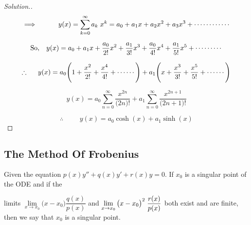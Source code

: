 \documentclass[11pt,a4paper]{article}
\theoremstyle{definition}
\newenvironment{solution}
  {\renewcommand{\qedsymbol}{}\begin{proof}[\textit{Solution}.]}
  {\end{proof}}
\begin{document}
\begin{solution}
$$\implies \hspace{1cm} y(x) = \sum^{\infty}_{k = 0} a_k\hspace{0.1cm}x^k = a_0 + a_1x + a_2 x^2 + a_3x^3+ \cdots\cdots\cdots\cdots$$

$$\text{So},\hspace{0.3cm} y(x) = a_0 + a_1x + \frac{a_0}{2!}x^2 + \frac{a_1}{3!}x^3 + \frac{a_0}{4!}x^4 + \frac{a_1}{5!}x^5 +\cdots\cdots\cdots$$

$$\therefore\hspace{0.5cm} y(x) = a_0\Bigg( 1 + \frac{x^2}{2!}+ \frac{x^4}{4!} +\cdots\cdots\Bigg) + a_1 \Bigg(x + \frac{x^3}{3!} + \frac{x^5}{5!}+ \cdots\cdots \Bigg)$$


$$y(x) = a_0 \sum^{\infty}_{n = 0} \frac{x^{2n}}{\big(2n\big)!} + a_1 \sum^{\infty}_{n=0} \frac{x^{2n+1}}{\big(2n+1\big)!}$$

$$\therefore\hspace{1cm} y(x) = a_0 \cosh (x) + a_1 \sinh (x)$$
\end{solution}


{\color[wave]{485}\subsection{The Method Of Frobenius}}
Given the equation $p(x)y'' + q(x)y' + r(x)y = 0$. If $x_0$ is a singular point of the ODE and if the


 limits $\lim\limits_{x \rightarrow x_0}\big(x -x_0\big) \dfrac{q(x)}{p(x)}$ and $\lim\limits_{x \rightarrow x_0}\big(x -x_0\big)^2\hspace{0.1cm} \dfrac{r(x)}{p(x)}$ both exist and are finite, then we say that $x_0$ is  a singular point.
\end{document}
